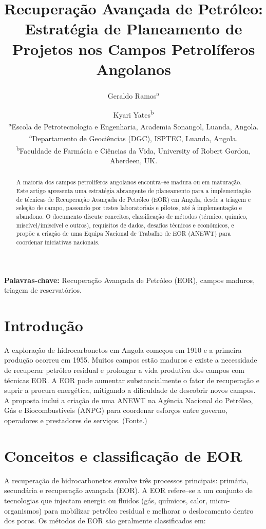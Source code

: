 \documentclass[11pt,a4paper]{article}
\title{Recuperação Avançada de Petróleo: \\ Estratégia de Planeamento de Projetos nos Campos Petrolíferos Angolanos}
\author{Geraldo Ramos\textsuperscript{a} \and Kyari Yates\textsuperscript{b} \\
\small \textsuperscript{a}Escola de Petrotecnologia e Engenharia, Academia Sonangol, Luanda, Angola. \\
\small \textsuperscript{a}Departamento de Geociências (DGC), ISPTEC, Luanda, Angola. \\
\small \textsuperscript{b}Faculdade de Farmácia e Ciências da Vida, University of Robert Gordon, Aberdeen, UK.}
\date{}
\begin{document}
\maketitle


\begin{abstract}
A maioria dos campos petrolíferos angolanos encontra--se madura ou em maturação. 
Este artigo apresenta uma estratégia abrangente de planeamento para a implementação de técnicas de Recuperação Avançada de Petróleo (EOR) em Angola, desde a triagem e seleção de campo, passando por testes laboratoriais e pilotos, até à implementação e abandono. O documento discute conceitos, classificação de métodos (térmico, químico, miscível/imiscível e outros), requisitos de dados, desafios técnicos e económicos, e propõe a criação de uma Equipa Nacional de Trabalho de EOR (ANEWT) para coordenar iniciativas nacionais. 
\end{abstract}

\noindent \textbf{Palavras-chave:} Recuperação Avançada de Petróleo (EOR), campos maduros, triagem de reservatórios.

\section{Introdução}
A exploração de hidrocarbonetos em Angola começou em 1910 e a primeira produção ocorreu em 1955. Muitos campos estão maduros e existe a necessidade de recuperar petróleo residual e prolongar a vida produtiva dos campos com técnicas EOR. A EOR pode aumentar substancialmente o fator de recuperação e suprir a procura energética, mitigando a dificuldade de descobrir novos campos. A proposta inclui a criação de uma ANEWT na Agência Nacional do Petróleo, Gás e Biocombustíveis (ANPG) para coordenar esforços entre governo, operadores e prestadores de serviços. (Fonte.)

\section{Conceitos e classificação de EOR}
A recuperação de hidrocarbonetos envolve três processos principais: primária, secundária e recuperação avançada (EOR). A EOR refere--se a um conjunto de tecnologias que injectam energia ou fluidos (gás, químicos, calor, micro-organismos) para mobilizar petróleo residual e melhorar o deslocamento dentro dos poros. Os métodos de EOR são geralmente classificados em:
\end{document}

